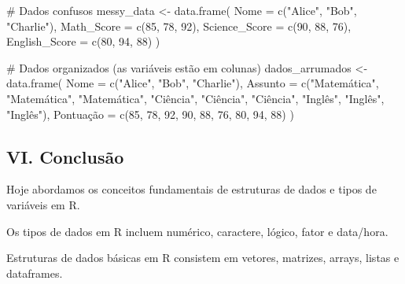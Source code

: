 \documentclass[
  letterpaper,
  DIV=11,
  numbers=noendperiod]{scrartcl}
\newenvironment{Shaded}{\begin{snugshade}}{\end{snugshade}}
\newcommand{\AttributeTok}[1]{\textcolor[rgb]{0.40,0.45,0.13}{#1}}
\newcommand{\CommentTok}[1]{\textcolor[rgb]{0.37,0.37,0.37}{#1}}
\newcommand{\DecValTok}[1]{\textcolor[rgb]{0.68,0.00,0.00}{#1}}
\newcommand{\FunctionTok}[1]{\textcolor[rgb]{0.28,0.35,0.67}{#1}}
\newcommand{\NormalTok}[1]{\textcolor[rgb]{0.00,0.23,0.31}{#1}}
\newcommand{\OtherTok}[1]{\textcolor[rgb]{0.00,0.23,0.31}{#1}}
\newcommand{\StringTok}[1]{\textcolor[rgb]{0.13,0.47,0.30}{#1}}
\begin{document}
\begin{Shaded}
\begin{Highlighting}[]
\CommentTok{\# Dados confusos}
\NormalTok{messy\_data }\OtherTok{\textless{}{-}} \FunctionTok{data.frame}\NormalTok{(}
   \AttributeTok{Nome =} \FunctionTok{c}\NormalTok{(}\StringTok{"Alice"}\NormalTok{, }\StringTok{"Bob"}\NormalTok{, }\StringTok{"Charlie"}\NormalTok{),}
   \AttributeTok{Math\_Score =} \FunctionTok{c}\NormalTok{(}\DecValTok{85}\NormalTok{, }\DecValTok{78}\NormalTok{, }\DecValTok{92}\NormalTok{),}
   \AttributeTok{Science\_Score =} \FunctionTok{c}\NormalTok{(}\DecValTok{90}\NormalTok{, }\DecValTok{88}\NormalTok{, }\DecValTok{76}\NormalTok{),}
   \AttributeTok{English\_Score =} \FunctionTok{c}\NormalTok{(}\DecValTok{80}\NormalTok{, }\DecValTok{94}\NormalTok{, }\DecValTok{88}\NormalTok{)}
\NormalTok{)}

\CommentTok{\# Dados organizados (as variáveis estão em colunas)}
\NormalTok{dados\_arrumados }\OtherTok{\textless{}{-}} \FunctionTok{data.frame}\NormalTok{(}
   \AttributeTok{Nome =} \FunctionTok{c}\NormalTok{(}\StringTok{"Alice"}\NormalTok{, }\StringTok{"Bob"}\NormalTok{, }\StringTok{"Charlie"}\NormalTok{),}
   \AttributeTok{Assunto =} \FunctionTok{c}\NormalTok{(}\StringTok{"Matemática"}\NormalTok{, }\StringTok{"Matemática"}\NormalTok{, }\StringTok{"Matemática"}\NormalTok{, }\StringTok{"Ciência"}\NormalTok{, }\StringTok{"Ciência"}\NormalTok{, }\StringTok{"Ciência"}\NormalTok{, }\StringTok{"Inglês"}\NormalTok{, }\StringTok{"Inglês"}\NormalTok{, }\StringTok{"Inglês"}\NormalTok{),}
\NormalTok{   Pontuação }\OtherTok{=} \FunctionTok{c}\NormalTok{(}\DecValTok{85}\NormalTok{, }\DecValTok{78}\NormalTok{, }\DecValTok{92}\NormalTok{, }\DecValTok{90}\NormalTok{, }\DecValTok{88}\NormalTok{, }\DecValTok{76}\NormalTok{, }\DecValTok{80}\NormalTok{, }\DecValTok{94}\NormalTok{, }\DecValTok{88}\NormalTok{)}
\NormalTok{)}
\end{Highlighting}
\end{Shaded}

\hypertarget{vi.-conclusuxe3o}{%
\subsection{VI. Conclusão}\label{vi.-conclusuxe3o}}

Hoje abordamos os conceitos fundamentais de estruturas de dados e tipos
de variáveis em R.

Os tipos de dados em R incluem numérico, caractere, lógico, fator e
data/hora.

Estruturas de dados básicas em R consistem em vetores, matrizes, arrays,
listas e dataframes.
\end{document}
